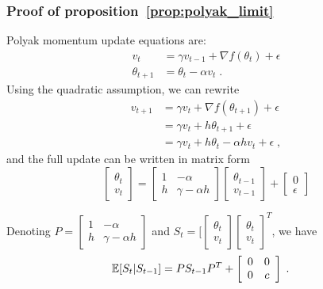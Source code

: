 \subsubsection{Proof of proposition~\ref{prop:polyak_limit}}
Polyak momentum update equations are:
\begin{align}
    v_t &= \gamma v_{t-1} + \nabla f(\theta_t) + \epsilon\\
    \theta_{t+1}    &= \theta_t - \alpha v_t \; .
\end{align}
Using the quadratic assumption, we can rewrite
\begin{align*}
    v_{t+1} &= \gamma v_t + \nabla f(\theta_{t+1}) + \epsilon\\
            &= \gamma v_t + h\theta_{t+1} + \epsilon\\
            &= \gamma v_t + h\theta_t - \alpha h v_t + \epsilon \; ,
\end{align*}
and the full update can be written in matrix form
\begin{equation}
\left[
\begin{array}{c}
\theta_{t}\\
v_{t}
\end{array}
\right]
=
\left[
\begin{array}{cc}
1   &   -\alpha\\
h   &   \gamma - \alpha h
\end{array}
\right]
\left[
\begin{array}{c}
\theta_{t-1}\\
v_{t-1}
\end{array}
\right]
+
\left[
\begin{array}{c}
0\\
\epsilon
\end{array}
\right]
\end{equation}

Denoting $\displaystyle P = \left[
\begin{array}{cc}
1   &   -\alpha\\
h   &   \gamma - \alpha h
\end{array}
\right]$ and $\displaystyle S_t = [\left[
\begin{array}{c}
\theta_{t}\\
v_{t}
\end{array}
\right]\left[
\begin{array}{c}
\theta_{t}\\
v_{t}
\end{array}
\right]^T$, we have
\begin{align}
    \mathbb{E}[S_t | S_{t-1}]
&= PS_{t-1} P^T + \left[
\begin{array}{cc}
0   &   0\\
0   &   c
\end{array}
\right] \; .
\end{align}

